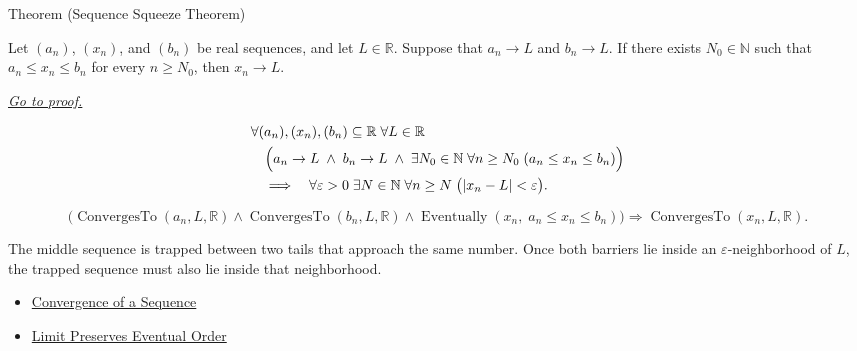 \begin{theorembox}{Theorem (Sequence Squeeze Theorem)}
\begin{theorem}
\label{thm:sequence-squeeze-theorem}

Let $(a_n)$, $(x_n)$, and $(b_n)$ be real sequences, and let
$L\in\mathbb{R}$. Suppose that $a_n\to L$ and $b_n\to L$. If there
exists $N_0\in\mathbb{N}$ such that $a_n\le x_n\le b_n$ for every
$n\ge N_0$, then $x_n\to L$.

\smallskip
\noindent
\hyperref[prf:sequence-squeeze-theorem]{\textit{Go to proof.}}
\end{theorem}
\end{theorembox}

\begin{remark*}
\[
\begin{aligned}
&\forall (a_n),(x_n),(b_n)\subseteq\mathbb{R}\;\forall L\in\mathbb{R}\\
&\quad\Bigl(
  a_n\to L
  \;\land\;
  b_n\to L
  \;\land\;
  \exists N_0\in\mathbb{N}\;\forall n\ge N_0\;(a_n\le x_n\le b_n)
\Bigr)\\
&\quad\Longrightarrow\quad
\forall \varepsilon>0\;\exists N\in\mathbb{N}\;\forall n\ge N\;
\bigl(|x_n-L|<\varepsilon\bigr).
\end{aligned}
\]
\end{remark*}

\begin{remark*}
\[
\bigl(
\operatorname{ConvergesTo}(a_n,L,\mathbb{R})
\land
\operatorname{ConvergesTo}(b_n,L,\mathbb{R})
\land
\operatorname{Eventually}(x_n,\;a_n\le x_n\le b_n)
\bigr)
\Longrightarrow
\operatorname{ConvergesTo}(x_n,L,\mathbb{R}).
\]
\end{remark*}

\begin{remark*}[Interpretation]
The middle sequence is trapped between two tails that approach the same
number. Once both barriers lie inside an $\varepsilon$-neighborhood of $L$,
the trapped sequence must also lie inside that neighborhood.
\end{remark*}

\begin{dependencies}
\begin{itemize}
  \item \hyperref[def:convergent-sequence]{Convergence of a Sequence}
  \item \hyperref[thm:limit-preserves-eventual-order]{Limit Preserves Eventual Order}
\end{itemize}
\end{dependencies}


